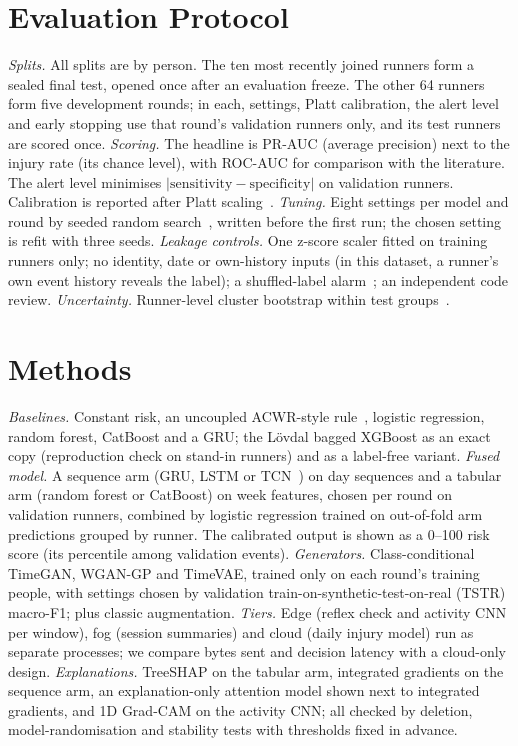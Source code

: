 \documentclass[conference]{IEEEtran}
\begin{document}
\section{Evaluation Protocol}
\textit{Splits.} All splits are by person. The ten most recently joined runners form a sealed
final test, opened once after an evaluation freeze. The other 64 runners form five development
rounds; in each, settings, Platt calibration, the alert level and early stopping use that
round's validation runners only, and its test runners are scored once.
\textit{Scoring.} The headline is PR-AUC (average precision) next to the injury rate (its
chance level), with ROC-AUC for comparison with the literature. The alert level minimises
$|\mathrm{sensitivity}-\mathrm{specificity}|$ on validation runners. Calibration is reported
after Platt scaling~\cite{vancalster2019}.
\textit{Tuning.} Eight settings per model and round by seeded random search~\cite{bergstra2012},
written before the first run; the chosen setting is refit with three seeds.
\textit{Leakage controls.} One z-score scaler fitted on training runners only; no identity,
date or own-history inputs (in this dataset, a runner's own event history reveals the label);
a shuffled-label alarm~\cite{ojala2010}; an independent code review.
\textit{Uncertainty.} Runner-level cluster bootstrap within test groups~\cite{field2007}.

\section{Methods}
\textit{Baselines.} Constant risk, an uncoupled ACWR-style rule~\cite{lolli2019}, logistic
regression, random forest, CatBoost and a GRU; the L\"ovdal bagged XGBoost as an exact copy
(reproduction check on stand-in runners) and as a label-free variant.
\textit{Fused model.} A sequence arm (GRU, LSTM or TCN~\cite{bai2018}) on day sequences and a
tabular arm (random forest or CatBoost) on week features, chosen per round on validation runners,
combined by logistic regression trained on out-of-fold arm predictions grouped by runner. The
calibrated output is shown as a 0--100 risk score (its percentile among validation events).
\textit{Generators.} Class-conditional TimeGAN, WGAN-GP and TimeVAE, trained only on each round's
training people, with settings chosen by validation train-on-synthetic-test-on-real (TSTR)
macro-F1; plus classic augmentation.
\textit{Tiers.} Edge (reflex check and activity CNN per window), fog (session summaries) and
cloud (daily injury model) run as separate processes; we compare bytes sent and decision latency
with a cloud-only design.
\textit{Explanations.} TreeSHAP on the tabular arm, integrated gradients on the sequence arm, an
explanation-only attention model shown next to integrated gradients, and 1D Grad-CAM on the
activity CNN; all checked by deletion, model-randomisation and stability tests with thresholds
fixed in advance.
\end{document}
